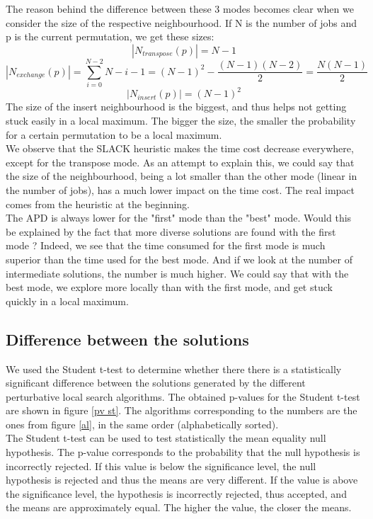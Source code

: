 The reason behind the difference between these 3 modes becomes clear when we consider the size of the respective neighbourhood. If N is the number of jobs and p is the current permutation, we get these sizes:
$$|N_{transpose}(p)| = N-1$$
$$|N_{exchange}(p)| = \sum_{i=0}^{N-2}{N-i-1} = (N-1)^2 - \frac{(N-1)(N-2)}{2} = \frac{N(N-1)}{2}$$
$$|N_{insert}(p)| = (N-1)^2$$
The size of the insert neighbourhood is the biggest, and thus helps not getting stuck easily in a local maximum. The bigger the size, the smaller the probability for a certain permutation to be a local maximum.\\

We observe that the SLACK heuristic makes the time cost decrease everywhere, except for the transpose mode. As an attempt to explain this, we could say that the size of the neighbourhood, being a lot smaller than the other mode (linear in the number of jobs), has a much lower impact on the time cost. The real impact comes from the heuristic at the beginning.\\

The APD is always lower for the "first" mode than the "best" mode. Would this be explained by the fact that more diverse solutions are found with the first mode ? Indeed, we see that the time consumed for the first mode is much superior than the time used for the best mode. And if we look at the number of intermediate solutions, the number is much higher. We could say that with the best mode, we explore more locally than with the first mode, and get stuck quickly in a local maximum.

\subsection{Difference between the solutions}
We used the Student t-test to determine whether there there is a statistically significant difference between the solutions generated by the different perturbative local search algorithms. The obtained p-values for the Student t-test are shown in figure \ref{pv st}. The algorithms corresponding to the numbers are the ones from figure \ref{al}, in the same order (alphabetically sorted).\\

The Student t-test can be used to test statistically the mean equality null hypothesis. The p-value corresponds to the probability that the null hypothesis is incorrectly rejected. If this value is below the significance level, the null hypothesis is rejected and thus the means are very different. If the value is above the significance level, the hypothesis is incorrectly rejected, thus accepted, and the means are approximately equal. The higher the value, the closer the means.\\

